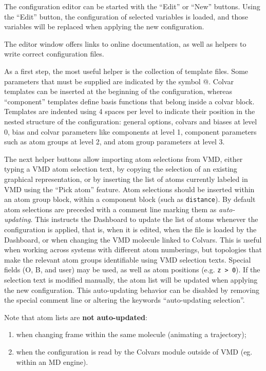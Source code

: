 {The configuration editor can be started with the ``Edit'' or ``New'' buttons.
Using the ``Edit'' button, the configuration of selected variables is loaded, and those variables will be replaced when applying the new configuration.

The editor window offers links to online documentation, as well as helpers to write correct configuration files.

As a first step, the most useful helper is the collection of template files.
Some parameters that must be supplied are indicated by the symbol @.
Colvar templates can be inserted at the beginning of the configuration, whereas ``component'' templates define basis functions that belong inside a colvar block.
Templates are indented using 4 spaces per level to indicate their position in the nested structure of the configuration: general options, colvars and biases at level 0,
bias and colvar parameters like components at level 1, component parameters such as atom groups at level 2, and atom group parameters at level 3.

The next helper buttons allow importing atom selections from VMD, either typing a VMD atom selection text, by copying the selection of an existing graphical representation, or by inserting the list of atoms currently labeled in VMD using the ``Pick atom'' feature.
Atom selections should be inserted within an atom group block, within a component block (such as \texttt{distance}).
By default atom selections are preceded with a comment line marking them as \emph{auto-updating}.
This instructs the Dashboard to update the list of atoms whenever the configuration is applied, that is, when it is edited, when the file is loaded by the Dashboard, or when changing the VMD molecule linked to Colvars.
This is useful when working across systems with different atom numberings, but topologies that make the relevant atom groups identifiable using VMD selection texts.
Special fields (O, B, and user) may be used, as well as atom positions (e.g. \texttt{z > 0}).
If the selection text is modified manually, the atom list will be updated when applying the new configuration.
This auto-updating behavior can be disabled by removing the special comment line or altering the keywords ``auto-updating selection''.

Note that atom lists are \textbf{not auto-updated}:
\begin{enumerate}
  \item when changing frame within the same molecule (animating a trajectory);
  \item when the configuration is read by the Colvars module outside of VMD (eg. within an MD engine).
\end{enumerate}

}
